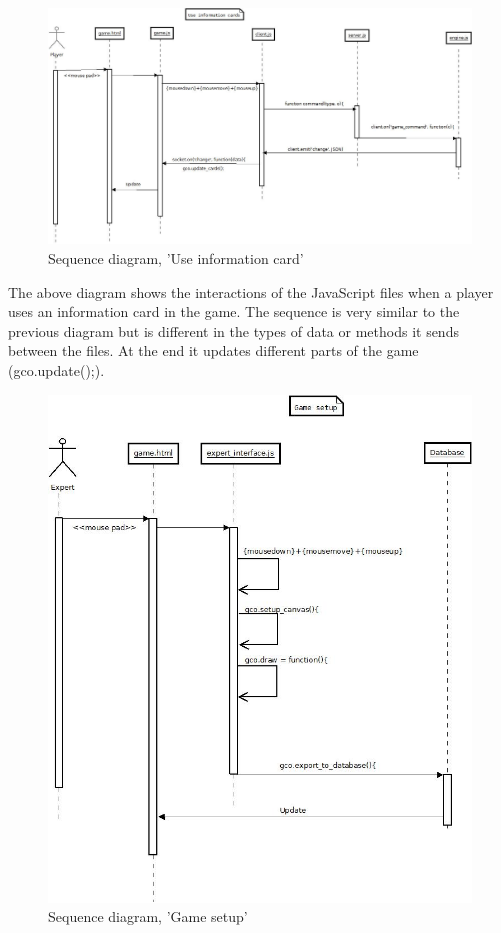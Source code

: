 \begin{figure}[H]
  \centering
    \includegraphics[width=1.0\textwidth]{img/useinfocardssekvens.jpeg}
  \caption{Sequence diagram, 'Use information card'} 
  \label{fig:useinfoseq}
\end{figure}

The above diagram shows the interactions of the JavaScript files when a player uses an information card in the game. The sequence is very similar to the previous diagram but is different in the types of data or methods it sends between the files. At the end it updates different parts of the game (gco.update();).\\


\begin{figure}[H]
  \centering
    \includegraphics[width=1.0\textwidth]{img/gamesetupsekvens.jpeg}
  \caption{Sequence diagram, 'Game setup'} 
  \label{fig:gamesetupseq}
\end{figure}

